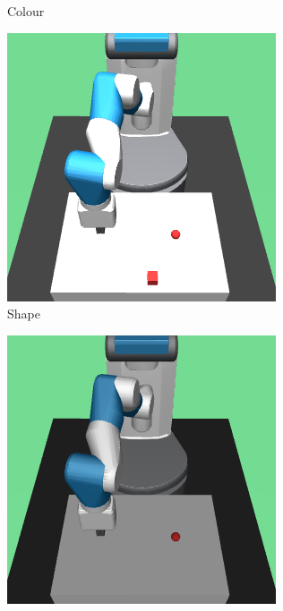\begin{figure}[h!]
\begin{subfigure}{0.32\textwidth}
    \caption{Colour}
  \end{subfigure}
  \begin{subfigure}{0.32\textwidth}
    \includegraphics[width=\textwidth]{figures/chapter6/test_observations/shape}
    \caption{Shape}
  \end{subfigure}
  \begin{subfigure}{0.32\textwidth}
    \includegraphics[width=\textwidth]{figures/chapter6/test_observations/illumination}

\end{subfigure}
\end{figure}
